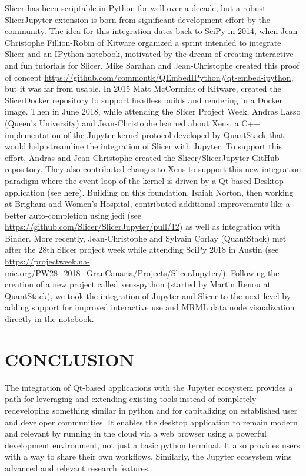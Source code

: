 \documentclass{IEEEcsmag}
\begin{document}
Slicer has been scriptable in Python for well over a decade, but a robust SlicerJupyter extension is born from significant development effort by the community. The idea for this integration dates back to SciPy in 2014, when Jean-Christophe Fillion-Robin of Kitware organized a sprint intended to integrate Slicer and an IPython notebook, motivated by the dream of creating interactive and fun tutorials for Slicer. Mike Sarahan and Jean-Christophe created this proof of concept \url{https://github.com/commontk/QEmbedIPython#qt-embed-ipython}, but it was far from usable. In 2015 Matt McCormick of Kitware, created the SlicerDocker repository to support headless builds and rendering in a Docker image. Then in June 2018, while attending the Slicer Project Week, Andras Lasso (Queen’s University) and Jean-Christophe learned about Xeus, a C++ implementation of the Jupyter kernel protocol developed by QuantStack that would help streamline the integration of Slicer with Jupyter. To support this effort, Andras and Jean-Christophe created the Slicer/SlicerJupyter GitHub repository. They also contributed changes to Xeus to support this new integration paradigm where the event loop of the kernel is driven by a Qt-based Desktop application (see here). Building on this foundation, Isaiah Norton, then working at Brigham and Women’s Hospital, contributed additional improvements like a better auto-completion using jedi (see \url{https://github.com/Slicer/SlicerJupyter/pull/12}) as well as integration with Binder. More recently, Jean-Christophe and Sylvain Corlay (QuantStack) met after the 28th Slicer project week while attending SciPy 2018 in Austin (see \url{https://projectweek.na-mic.org/PW28_2018_GranCanaria/Projects/SlicerJupyter/}). Following the creation of a new project called xeus-python (started by Martin Renou at QuantStack), we took the integration of Jupyter and Slicer to the next level by adding support for improved interactive use and MRML data node visualization directly in the notebook.


\section{CONCLUSION}

The integration of Qt-based applications with the Jupyter ecosystem provides a path for leveraging and extending existing tools instead of completely redeveloping something similar in python and for capitalizing on established user and developer communities. It enables the desktop application to remain modern and relevant by running in the cloud via a web browser using a powerful development environment, not just a basic python terminal. It also provides users with a way to share their own workflows. Similarly, the Jupyter ecosystem wins advanced and relevant research features. 
\end{document}
